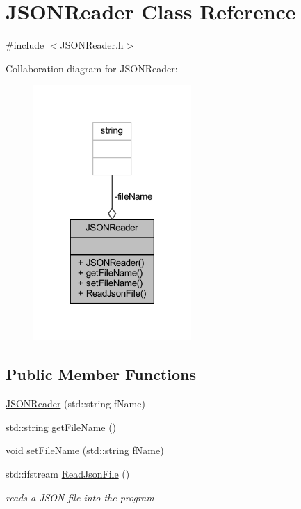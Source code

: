 \hypertarget{class_j_s_o_n_reader}{}\section{J\+S\+O\+N\+Reader Class Reference}
\label{class_j_s_o_n_reader}


{\ttfamily \#include $<$J\+S\+O\+N\+Reader.\+h$>$}



Collaboration diagram for J\+S\+O\+N\+Reader\+:\nopagebreak
\begin{figure}[H]
\begin{center}
\leavevmode
\includegraphics[width=170pt]{class_j_s_o_n_reader__coll__graph}
\end{center}
\end{figure}
\subsection*{Public Member Functions}
\begin{DoxyCompactItemize}
\item 
\hyperlink{class_j_s_o_n_reader_aa1480326d69874d2bab7183932b2d495}{J\+S\+O\+N\+Reader} (std\+::string f\+Name)
\item 
std\+::string \hyperlink{class_j_s_o_n_reader_abde6e34eccb5e195218923b8260391b2}{get\+File\+Name} ()
\item 
void \hyperlink{class_j_s_o_n_reader_ac9652f637597153cffe536fd2112c4f2}{set\+File\+Name} (std\+::string f\+Name)
\item 
std\+::ifstream \hyperlink{class_j_s_o_n_reader_a47c90ec12638eed9ea96feefc76096e1}{Read\+Json\+File} ()
\begin{DoxyCompactList}\small\item\em reads a J\+S\+ON file into the program \end{DoxyCompactList}\end{DoxyCompactItemize}
